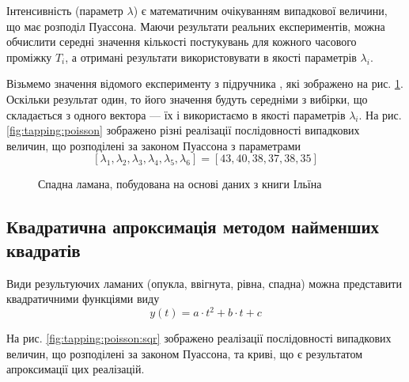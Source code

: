 Інтенсивність (параметр $\lambda$) є математичним очікуванням випадкової
величини, що має розподіл Пуассона.
Маючи результати реальних експериментів, можна обчислити середні значення
кількості постукувань для кожного часового проміжку $T_i$, а отримані
результати використовувати в якості параметрів $\lambda_i$.

Візьмемо значення відомого експерименту з підручника \cite{Ilin:2001}, які
зображено на рис. \ref{fig:tapping:Ilin01}.
Оскільки результат один, то його значення будуть середніми з вибірки, що
складається з одного вектора --- їх і використаємо в якості параметрів
$\lambda_i$.
На рис. \ref{fig:tapping:poisson} зображено різні реалізації послідовності
випадкових величин, що розподілені за законом Пуассона з параметрами
\begin{equation*}
  \left[ \lambda_{1}, \lambda_{2}, \lambda_{3}, \lambda_{4}, \lambda_{5},
         \lambda_{6} \right]
  = \left[ 43, 40, 38, 37, 38, 35 \right]
\end{equation*}

\begin{figure}[h]
  \centering
  \caption{Спадна ламана, побудована на основі даних з книги Ільїна}
  \label{fig:tapping:Ilin01}
\end{figure}


\subsection{Квадратична апроксимація методом найменших квадратів}

Види результуючих ламаних (опукла, ввігнута, рівна, спадна) можна представити
квадратичними функціями виду
\begin{equation*}
  y\left( t \right) = a \cdot t^2 + b \cdot t + c
\end{equation*}

На рис. \ref{fig:tapping:poisson:sqr} зображено реалізації послідовності
випадкових величин, що розподілені за законом Пуассона, та криві, що є
результатом апроксимації цих реалізацій.

